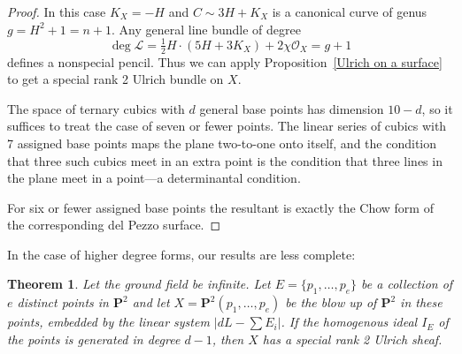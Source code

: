 \documentclass{jams-l}
\newtheorem{theorem}{Theorem}[section]
\theoremstyle{definition}
\theoremstyle{remark}
\newcommand{\cL}{{\mathcal L}}
\newcommand{\cO}{{\mathcal O}}
\newcommand{\PP}{{\mathbf P}}
\begin{document}
\begin{proof}  In this case $K_X=-H$ and $C\sim 3H+K_X$ is a canonical curve
of genus $g=H^2+1=n+1$.
Any general line bundle of
degree 
\[
\deg \cL = \tfrac12 H\cdot(5H+3K_X) + 2\chi\cO_X=g+1
\] 
defines a nonspecial pencil. Thus we can apply
Proposition~\ref{Ulrich on a surface} to get a special rank 2 Ulrich bundle on $X$.

The space of ternary cubics with $d$ general base points
has dimension $10-d$, so
it suffices to treat the case
of seven or fewer points. The linear series of
cubics with 7 assigned base points maps the plane two-to-one
onto itself, and the condition that three such cubics meet
in an extra point is the condition that three lines in the plane
meet in a point---a determinantal condition. 

For six or fewer assigned base points the resultant is
exactly the Chow form of the corresponding del Pezzo surface.
\end{proof}

In the case of higher degree forms, our results are less
complete:

\begin{theorem}\label{rational surfaces} Let the ground field be infinite. 
Let $E = \{p_1,\ldots,p_e\}$ be a collection of 
$e$ distinct points in $\PP^2$ and let $X = \PP^2(p_1,\ldots,p_e)$ 
be the blow up of $\PP^2$
in these points, embedded by the linear system $|dL-\sum E_i|$. If the 
homogenous ideal
$I_E$ of the points is generated in degree $d-1$, then $X$ has a special 
rank 2 Ulrich sheaf.
\end{theorem}
\end{document}

